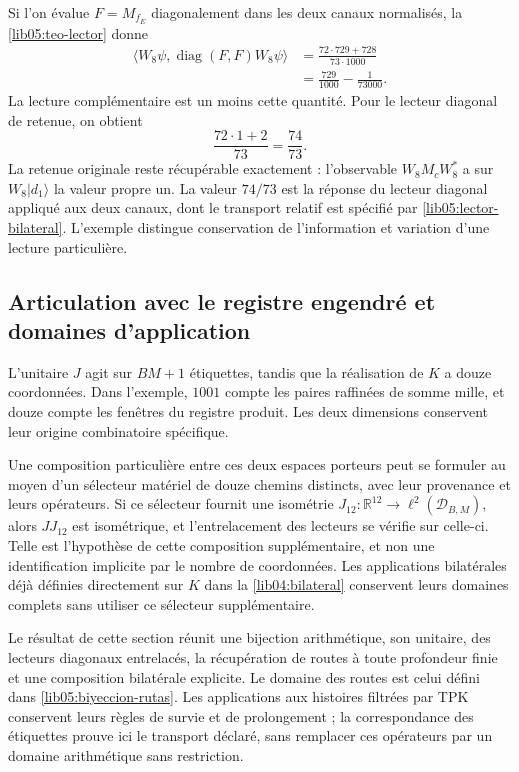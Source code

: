 Si l’on évalue \(F=M_{f_E}\) diagonalement dans les deux canaux
normalisés, la \cref{lib05:teo-lector} donne
\begin{equation}
 \begin{split}
 \langle W_8\psi,\operatorname{diag}(F,F)W_8\psi\rangle
 &=\frac{72\cdot729+728}{73\cdot1000}\\
 &=\frac{729}{1000}-\frac1{73000}.
 \end{split}
 \label{lib05:ejemplo-fraccion}
\end{equation}
La lecture complémentaire est un moins cette quantité. Pour le
lecteur diagonal de retenue, on obtient
\begin{equation}
 \frac{72\cdot1+2}{73}=\frac{74}{73}.
 \label{lib05:ejemplo-acarreo}
\end{equation}
La retenue originale reste récupérable exactement :
l’observable \(W_8M_cW_8^*\) a sur \(W_8|d_1\rangle\)
la valeur propre un. La valeur \(74/73\) est la réponse du
lecteur diagonal appliqué aux deux canaux, dont le transport relatif
est spécifié par \eqref{lib05:lector-bilateral}. L’exemple
distingue conservation de l’information et variation d’une lecture
particulière.

\subsection{Articulation avec le registre engendré et domaines d'application}
\label{lib05:dominios}

L’unitaire \(J\) agit sur \(BM+1\) étiquettes, tandis que
la réalisation de \(K\) a douze coordonnées. Dans l’exemple,
\(1001\) compte les paires raffinées de somme mille, et douze compte
les fenêtres du registre produit. Les deux dimensions conservent leur
origine combinatoire spécifique.

Une composition particulière entre ces deux espaces porteurs peut se formuler au moyen d'un sélecteur matériel de douze chemins distincts, avec leur provenance et leurs opérateurs. Si ce sélecteur fournit une isométrie \(J_{12}:\mathbb R^{12}\to\ell^2(\mathcal D_{B,M})\), alors \(JJ_{12}\) est isométrique, et l'entrelacement des lecteurs se vérifie sur celle-ci. Telle est l'hypothèse de cette composition supplémentaire, et non une identification implicite par le nombre de coordonnées. Les applications bilatérales déjà définies directement sur \(K\) dans la \cref{lib04:bilateral} conservent leurs domaines complets sans utiliser ce sélecteur supplémentaire.

Le résultat de cette section réunit une bijection arithmétique, son
unitaire, des lecteurs diagonaux entrelacés, la récupération de routes à
toute profondeur finie et une composition bilatérale explicite.
Le domaine des routes est celui défini dans
\eqref{lib05:biyeccion-rutas}. Les applications aux histoires
filtrées par TPK conservent leurs règles de survie et de
prolongement ; la correspondance des étiquettes prouve ici le
transport déclaré, sans remplacer ces opérateurs par un domaine
arithmétique sans restriction.

